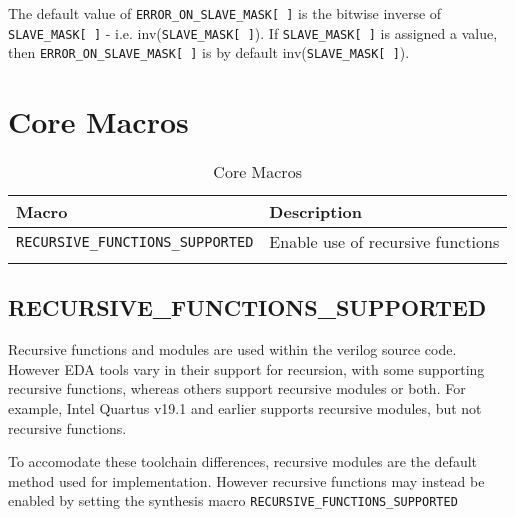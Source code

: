 The default value of \texttt{ERROR\_ON\_SLAVE\_MASK[\,]} is the bitwise inverse of \texttt{SLAVE\_MASK[\,]} - i.e. inv(\texttt{SLAVE\_MASK[\,]}). If \texttt{SLAVE\_MASK[\,]} is assigned a value, then \texttt{ERROR\_ON\_SLAVE\_MASK[\,]} is by default inv(\texttt{SLAVE\_MASK[\,]}).

\section{Core Macros}\label{core-macros}

\begin{longtable}[]{@{}ll@{}}
\toprule
Macro & Description\tabularnewline
\midrule
\endhead
\texttt{RECURSIVE\_FUNCTIONS\_SUPPORTED} & Enable use of recursive functions \tabularnewline
\bottomrule
\caption{Core Macros}
\end{longtable}

\subsection{RECURSIVE\_FUNCTIONS\_SUPPORTED}\label{recursive_functions_supported}

Recursive functions and modules are used within the verilog source code. However EDA tools vary in their support for recursion, with some supporting recursive functions, whereas others support recursive modules or both. For example, Intel Quartus v19.1 and earlier supports recursive modules, but not recursive functions. 

To accomodate these toolchain differences, recursive modules are the default method used for implementation. However recursive functions may instead be enabled by setting the synthesis macro \texttt{RECURSIVE\_FUNCTIONS\_SUPPORTED}

